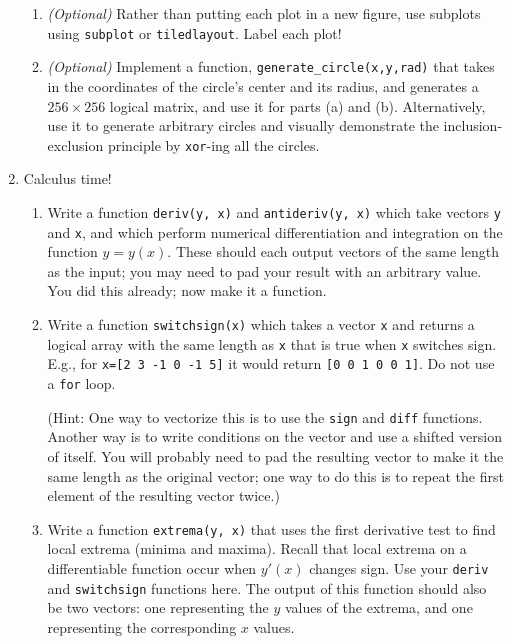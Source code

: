 \documentclass{article}
\begin{document}
\begin{enumerate}
\begin{enumerate}
			\item \textit{(Optional)} Rather than putting each plot in a new figure, use subplots using \lstinline|subplot| or \lstinline|tiledlayout|. Label each plot!
			
			\item \textit{(Optional)} Implement a function, \lstinline|generate_circle(x,y,rad)| that takes in the coordinates of the circle's center and its radius, and generates a $256\times 256$ logical matrix, and use it for parts (a) and (b). Alternatively, use it to generate arbitrary circles and visually demonstrate the inclusion-exclusion principle by \lstinline|xor|-ing all the circles.
		\end{enumerate}
	
		\clearpage
		\item
		Calculus time!
		\begin{enumerate}
			\item Write a function \lstinline|deriv(y, x)| and \lstinline|antideriv(y, x)| which take vectors \lstinline|y| and \lstinline|x|, and which perform numerical differentiation and integration on the function $y=y(x)$. These should each output vectors of the same length as the input; you may need to pad your result with an arbitrary value. You did this already; now make it a function.
			
			\item Write a function \lstinline|switchsign(x)| which takes a vector \lstinline|x| and returns a logical array with the same length as \lstinline|x| that is true when \lstinline|x| switches sign. E.g., for \lstinline|x=[2 3 -1 0 -1 5]| it would return \lstinline|[0 0 1 0 0 1]|. Do not use a \lstinline|for| loop.
			
			(Hint: One way to vectorize this is to use the \lstinline|sign| and \lstinline|diff| functions. Another way is to write conditions on the vector and use a shifted version of itself. You will probably need to pad the resulting vector to make it the same length as the original vector; one way to do this is to repeat the first element of the resulting vector twice.)
			
			\item Write a function \lstinline|extrema(y, x)| that uses the first derivative test to find local extrema (minima and maxima). Recall that local extrema on a differentiable function occur when $y'(x)$ changes sign. Use your \lstinline|deriv| and \lstinline|switchsign| functions here. The output of this function should also be two vectors: one representing the $y$ values of the extrema, and one representing the corresponding $x$ values.
			

\end{enumerate}
\end{enumerate}
\end{document}

